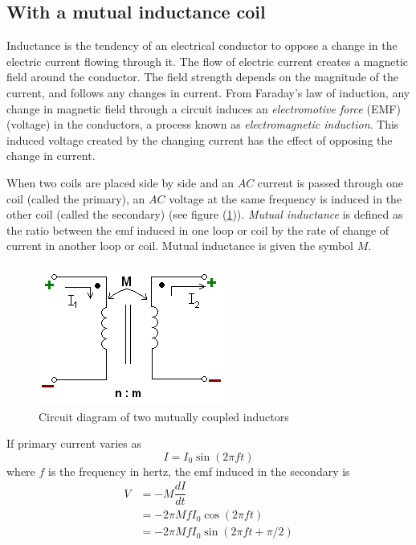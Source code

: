 \documentclass[%
 reprint,
nofootinbib,
 amsmath,amssymb,
 aps,
]{revtex4-2}
\begin{document}
    \subsection{With a mutual inductance coil}
        Inductance is the tendency of an electrical conductor to oppose a change in the electric current flowing through it. The flow of electric current creates a magnetic field around the conductor. The field strength depends on the magnitude of the current, and follows any changes in current. From Faraday's law of induction, any change in magnetic field through a circuit induces an \textit{electromotive force} (EMF) (voltage) in the conductors, a process known as \textit{electromagnetic induction}. This induced voltage created by the changing current has the effect of opposing the change in current.
        \par
        When two coils are placed side by side and an $AC$ current is passed through one coil (called the primary), an $AC$ voltage at the same frequency is induced in the other coil (called the secondary) (see figure (\ref{fig:mutintro})). \textit{Mutual inductance} is defined as the ratio between the emf induced in one loop or coil by the rate of change of current in another loop or coil. Mutual inductance is given the symbol $M$.
        \begin{figure}
            \centering
            \includegraphics{Figures/Mutually_inducting_inductors.png}
            \caption{Circuit diagram of two mutually coupled inductors}
            \label{fig:mutintro}
        \end{figure}
        \par
        If primary current varies as
        \begin{equation}
            I = I_0 \sin (2 \pi f t)
        \end{equation}
        where $f$ is the frequency in hertz, the emf induced in the secondary is
        \begin{equation}
        \label{eq9}
            \begin{split}
                V
                &= - M \dfrac{dI}{dt} \\
                &= -2 \pi M f I_0 \cos (2 \pi f t) \\
                &= -2 \pi M f I_0 \sin (2 \pi f t + \pi/2)
            \end{split}
        \end{equation}
\end{document}
